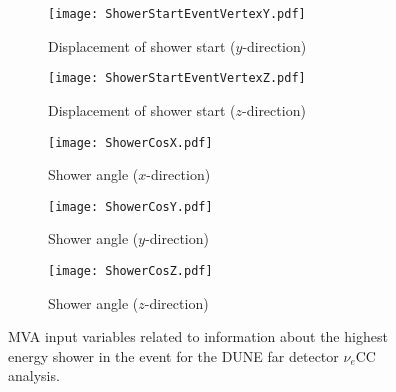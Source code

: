 \begin{figure}\ContinuedFloat
  \centering
  \begin{subfigure}[t]{0.4\linewidth}
    \centering
    \texttt{[image: ShowerStartEventVertexY.pdf]}
    \caption{Displacement of shower start ($y$-direction)}
  \end{subfigure}
  \begin{subfigure}[t]{0.4\linewidth}
    \centering
    \texttt{[image: ShowerStartEventVertexZ.pdf]}
    \caption{Displacement of shower start ($z$-direction)}
  \end{subfigure}
  \begin{subfigure}[t]{0.4\linewidth}
    \centering
    \texttt{[image: ShowerCosX.pdf]}
    \caption{Shower angle ($x$-direction)}
  \end{subfigure}
  \begin{subfigure}[t]{0.4\linewidth}
    \centering
    \texttt{[image: ShowerCosY.pdf]}
    \caption{Shower angle ($y$-direction)}
  \end{subfigure}
  \begin{subfigure}[t]{0.4\linewidth}
    \centering
    \texttt{[image: ShowerCosZ.pdf]}
    \caption{Shower angle ($z$-direction)}
  \end{subfigure}
  \caption[]{MVA input variables related to information about the highest energy shower in the event for the DUNE far detector $\nu_e$CC analysis.}
  \label{fig:FDMVAShowerVariables}
\end{figure}

